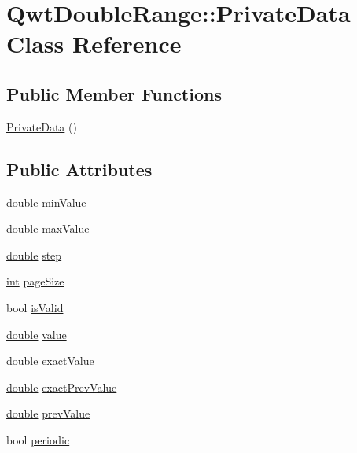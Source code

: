 \hypertarget{class_qwt_double_range_1_1_private_data}{\section{Qwt\-Double\-Range\-:\-:Private\-Data Class Reference}
\label{class_qwt_double_range_1_1_private_data}
}
\subsection*{Public Member Functions}
\begin{DoxyCompactItemize}
\item 
\hyperlink{class_qwt_double_range_1_1_private_data_a5d2c39f6811ec16adbf74a5d6b6fbe0e}{Private\-Data} ()
\end{DoxyCompactItemize}
\subsection*{Public Attributes}
\begin{DoxyCompactItemize}
\item 
\hyperlink{_super_l_u_support_8h_a8956b2b9f49bf918deed98379d159ca7}{double} \hyperlink{class_qwt_double_range_1_1_private_data_a999e1c8d20be41fc643fe35476c1462d}{min\-Value}
\item 
\hyperlink{_super_l_u_support_8h_a8956b2b9f49bf918deed98379d159ca7}{double} \hyperlink{class_qwt_double_range_1_1_private_data_a4a36aef416ac0a7f1710975cb00ffa6e}{max\-Value}
\item 
\hyperlink{_super_l_u_support_8h_a8956b2b9f49bf918deed98379d159ca7}{double} \hyperlink{class_qwt_double_range_1_1_private_data_ad96d8e08db4866d74aec33ba5bcef4e1}{step}
\item 
\hyperlink{ioapi_8h_a787fa3cf048117ba7123753c1e74fcd6}{int} \hyperlink{class_qwt_double_range_1_1_private_data_a8a6da785f3d9aff2343a28aa3f1c5d68}{page\-Size}
\item 
bool \hyperlink{class_qwt_double_range_1_1_private_data_a2370b2bf4cc4153c6f77380cc3becd4b}{is\-Valid}
\item 
\hyperlink{_super_l_u_support_8h_a8956b2b9f49bf918deed98379d159ca7}{double} \hyperlink{class_qwt_double_range_1_1_private_data_a09e0464ee1692e85f01f330be0953fd1}{value}
\item 
\hyperlink{_super_l_u_support_8h_a8956b2b9f49bf918deed98379d159ca7}{double} \hyperlink{class_qwt_double_range_1_1_private_data_af46e947141f6a3102de4f30a2176f2a8}{exact\-Value}
\item 
\hyperlink{_super_l_u_support_8h_a8956b2b9f49bf918deed98379d159ca7}{double} \hyperlink{class_qwt_double_range_1_1_private_data_abbad2e8b6cc19a31d8dca9cc2635e067}{exact\-Prev\-Value}
\item 
\hyperlink{_super_l_u_support_8h_a8956b2b9f49bf918deed98379d159ca7}{double} \hyperlink{class_qwt_double_range_1_1_private_data_a2ae20126424bd931b39f75e5259ca96d}{prev\-Value}
\item 
bool \hyperlink{class_qwt_double_range_1_1_private_data_a9e06bbcf42d2fb13e01d247f301e2cfb}{periodic}
\end{DoxyCompactItemize}


